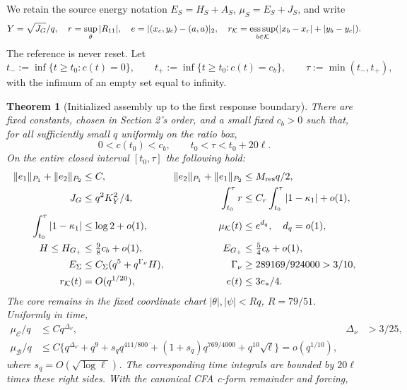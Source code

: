 \documentclass[11pt]{article}
\newtheorem{theorem}{Theorem}[section]
\theoremstyle{remark}\newtheorem{remark}[theorem]{Remark}
\newcommand{\KK}{\mathcal K}
\newcommand{\BB}{\mathcal B}
\newcommand{\Gp}{G_+}
\begin{document}
We retain the source energy notation $E_S=H_S+A_S$,
$\mu_S=E_S+J_S$, and write
\[
 Y=\sqrt{J_G}/q,\quad r=\sup_\theta|R_{11}|,\quad
 e=|(x_c,y_c)-(a,a)|_2,\quad
 r_{\KK}=\mathop{\rm ess\,sup}_{b\in\KK}
       (|x_b-x_c|+|y_b-y_c|).
\]
The reference is never reset. Let
\begin{equation}
 t_-:=\inf\{t\ge t_0:c(t)=0\},\qquad
 t_+:=\inf\{t\ge t_0:c(t)=c_b\},\qquad
 \tau:=\min(t_-,t_+),
 \label{an03wptv1:stops}
\end{equation}
with the infimum of an empty set equal to infinity.

\begin{theorem}[Initialized assembly up to the first response boundary]
\label{an03wptv1:twoboundary}
There are fixed constants, chosen in Section 2's order, and a
small fixed $c_b>0$ such that, for all sufficiently small $q$
uniformly on the ratio box,
\[
 0<c(t_0)<c_b,\qquad t_0<\tau<t_0+20\ell.
\]
On the entire closed interval $[t_0,\tau]$ the following hold:
\begin{align}
 \|e_1\|_{P_1}+\|e_2\|_{P_2}&\le C,&
 \|e_2\|_{P_1}+\|e_1\|_{P_2}&\le M_{\rm res}q/2,
 \label{an03wptv1:residuals}\\
 J_G&\le q^2K_Y^2/4,&
 \int_{t_0}^\tau r&\le C_r\int_{t_0}^\tau|1-\kappa_1|+o(1),
 \label{an03wptv1:transverse}\\
 \int_{t_0}^\tau|1-\kappa_1|&\le\log2+o(1),&
 \mu_{\KK}(t)&\le e^{d_q},\quad d_q=o(1),
 \label{an03wptv1:learning}\\
 H\le H_{\Gp}&\le\tfrac98c_b+o(1),&
 E_{\Gp}&\le\tfrac54c_b+o(1),
 \label{an03wptv1:energies}\\
 E_\Sigma&\le C_\Sigma(q^5+q^{\Gamma_\nu}H),&
 \Gamma_\nu&\ge289169/924000>3/10,
 \label{an03wptv1:secondary}\\
 r_{\KK}(t)&=O(q^{1/20}),& e(t)&\le3e_*/4.
 \label{an03wptv1:coreconclusion}
\end{align}
The core remains in the fixed coordinate chart
$|\theta|,|\psi|<Rq$, $R=79/51$. Uniformly in time,
\begin{align}
 \mu_{\mathcal C}/q&\le Cq^{\Delta_\nu},
       &\Delta_\nu&>3/25,\nonumber\\
 \mu_{\BB}/q&\le C\{q^{\Delta_\nu}+q^9
      +s_qq^{411/800}+(1+s_q)q^{769/4000}
      +q^{10}\sqrt\ell\}=o(q^{1/10}),
 \label{an03wptv1:outside}
\end{align}
where $s_q=O(\sqrt{\log\ell})$. The corresponding time integrals
are bounded by $20\ell$ times these right sides. With the canonical
CFA c-form remainder and forcing,
\begin{align}

\end{align}
\end{theorem}
\end{document}

